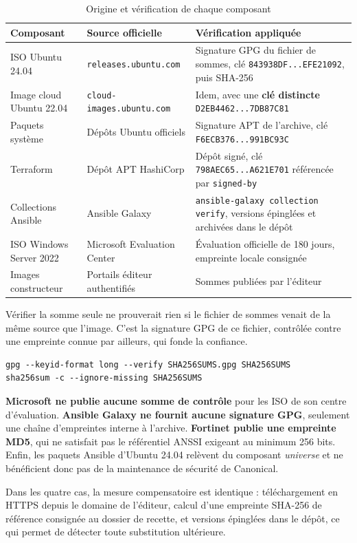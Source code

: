 \documentclass[11pt,a4paper]{article}
\newcommand{\ttb}[1]{\texttt{\small #1}}
\begin{document}
\begin{table}[H]
\centering
\caption{Origine et vérification de chaque composant}
\begin{tabularx}{\textwidth}{@{}L{3.4cm}L{4.0cm}Y@{}}
\toprule
\textbf{Composant} & \textbf{Source officielle} & \textbf{Vérification appliquée} \\
\midrule
ISO Ubuntu 24.04 & \ttb{releases.ubuntu.com} & Signature GPG du fichier de
sommes, clé \ttb{843938DF...EFE21092}, puis SHA-256 \\
Image cloud Ubuntu 22.04 & \ttb{cloud-images.ubuntu.com} & Idem, avec une
\textbf{clé distincte} \ttb{D2EB4462...7DB87C81} \\
Paquets système & Dépôts Ubuntu officiels & Signature APT de l'archive, clé
\ttb{F6ECB376...991BC93C} \\
Terraform & Dépôt APT HashiCorp & Dépôt signé, clé \ttb{798AEC65...A621E701}
référencée par \ttb{signed-by} \\
Collections Ansible & Ansible Galaxy & \ttb{ansible-galaxy collection verify},
versions épinglées et archivées dans le dépôt \\
ISO Windows Server 2022 & Microsoft Evaluation Center & Évaluation officielle de
180 jours, empreinte locale consignée \\
Images constructeur & Portails éditeur authentifiés & Sommes publiées par
l'éditeur \\
\bottomrule
\end{tabularx}
\end{table}

Vérifier la somme seule ne prouverait rien si le fichier de sommes venait de la
même source que l'image. C'est la signature GPG de ce fichier, contrôlée contre
une empreinte connue par ailleurs, qui fonde la confiance.

\begin{lstlisting}
gpg --keyid-format long --verify SHA256SUMS.gpg SHA256SUMS
sha256sum -c --ignore-missing SHA256SUMS
\end{lstlisting}

\begin{alertbox}
\textbf{Microsoft ne publie aucune somme de contrôle} pour les ISO de son centre
d'évaluation. \textbf{Ansible Galaxy ne fournit aucune signature GPG}, seulement
une chaîne d'empreintes interne à l'archive. \textbf{Fortinet publie une empreinte
MD5}, qui ne satisfait pas le référentiel ANSSI exigeant au minimum 256 bits.
Enfin, les paquets Ansible d'Ubuntu 24.04 relèvent du composant \emph{universe} et
ne bénéficient donc pas de la maintenance de sécurité de Canonical.

Dans les quatre cas, la mesure compensatoire est identique : téléchargement en
HTTPS depuis le domaine de l'éditeur, calcul d'une empreinte SHA-256 de référence
consignée au dossier de recette, et versions épinglées dans le dépôt, ce qui
permet de détecter toute substitution ultérieure.
\end{alertbox}
\end{document}
